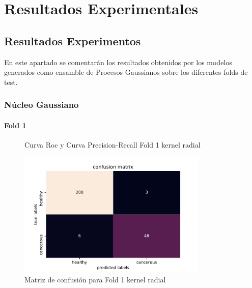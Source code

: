 \chapter{Resultados Experimentales}
\section{Resultados Experimentos}
En este apartado se comentarán los resultados obtenidos por los modelos generados como ensamble de Procesos Gaussianos sobre los diferentes folds de test.

\subsection{Núcleo Gaussiano}
\subsubsection{Fold 1}

\begin{figure}[H]
	\centering
	\caption{Curva Roc y Curva Precision-Recall Fold 1 kernel radial}
	\label{fig:resultados1}
\end{figure}

\newpage

\begin{figure}[H]
	\centering
	\includegraphics[width=90mm]{imagenes/confusion_mat1_gpflow}
	\caption{Matriz de confusión para Fold 1 kernel radial}
	\label{fig:conf1}
\end{figure}

